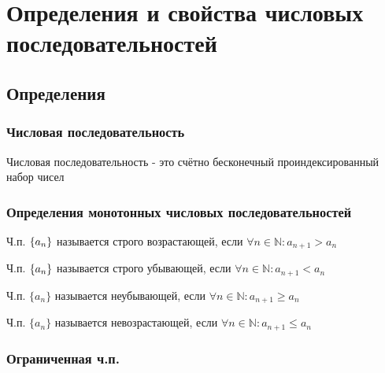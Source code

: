 \chapter{Определения и свойства числовых последовательностей}

\section{Определения}

\subsection{Числовая последовательность}

{
    Числовая последовательность - это счётно бесконечный проиндексированный набор чисел
}


\subsection{Определения монотонных числовых последовательностей}

{
    Ч.п. $ \{ a_n \} $ называется строго возрастающей, если $ \forall n \in \mathbb{N}: a_{n + 1} > a_{n} $

    Ч.п. $ \{ a_n \} $ называется строго убывающей, если $ \forall n \in \mathbb{N}: a_{n + 1} < a_{n} $

    Ч.п. $ \{ a_n \} $ называется неубывающей, если $ \forall n \in \mathbb{N}: a_{n + 1} \ge a_{n} $

    Ч.п. $ \{ a_n \} $ называется невозрастающей, если $ \forall n \in \mathbb{N}: a_{n + 1} \le a_{n} $
}


\subsection{Ограниченная ч.п.}

